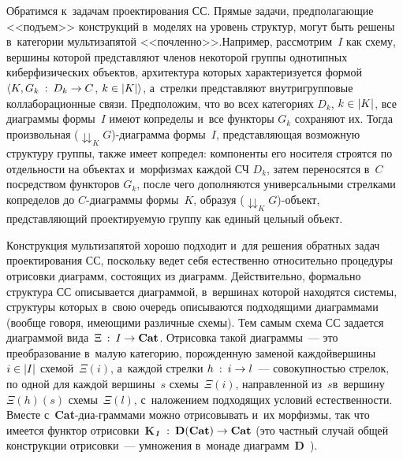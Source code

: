 \begin{multicols}{2}
Обратимся к~задачам проектирования СС. Прямые задачи, пред\-по\-ла\-га\-ющие 
<<подъем>> конструкций в~моделях на уровень структур, могут быть решены 
в~категории мультизапятой <<почленно>>.\linebreak Например, рассмотрим~$I$ как 
схему, вершины которой представляют членов некоторой группы однотипных 
киберфизических объектов, архитектура которых характеризуется формой  
$\langle K, G_k \: : \: D_k \hm\to C$, $k \hm\in \vert K\vert\rangle$, а~стрелки представляют 
внутригрупповые коллаборационные связи. Предположим, что во всех 
категориях $D_k$, $k \hm\in \vert K\vert$, все диаграммы формы~$I$ имеют 
копределы и~все функторы $G_k$ сохраняют их. Тогда произвольная  
($\downdownarrows_K G$)-диа\-грам\-ма формы~$I$, пред\-став\-ля\-ющая 
возможную структуру группы, также имеет копредел: компоненты его носителя 
строятся по от\-дель\-ности на объектах и~морфизмах каждой СЧ $D_k$, затем 
переносятся в~$C$ посредством функторов $G_k$, после чего дополняются 
универсальными стрелками копределов до $C$-диа\-грам\-мы формы~$K$, 
образуя ($\downdownarrows_K G$)-объект, представляющий про\-ек\-ти\-ру\-емую 
группу как единый цельный объект.

Конструкция мультизапятой хорошо подходит и~для решения обратных задач 
проектирования СС, поскольку ведет себя естественно относительно 
процедуры отрисовки диаграмм, со\-сто\-ящих из диаграмм. Действительно, 
формально структура СС описывается диаграммой, в~вершинах которой 
находятся сис\-те\-мы, структуры которых в~свою очередь описываются 
подходящими диаграммами (вообще говоря, имеющими различные схемы). Тем 
самым схема СС задается диаграммой вида~$\Xi \: : \: I \hm\to \mathbf{Cat}$. 
Отрисовка такой диаграммы~--- это преобразование в~малую категорию, 
порожденную заменой каждой\linebreak вершины $i \hm\in \vert I\vert$ схемой~$\Xi (i)$, 
а~каждой стрелки $h \: : \: i \hm\to l$~--- совокупностью стрелок, по одной для 
каждой вершины~$s$ схемы~$\Xi (i)$, на\-прав\-лен\-ной из~$s$\linebreak в~вершину~$\Xi (h)(s)$ 
схемы~$\Xi (l)$, с~наложением подходящих условий 
естественности. Вместе с~\textbf{Cat}-диа-\linebreak грам\-ма\-ми можно отрисовывать 
и~их морфизмы, так что имеется функтор отрисовки~\textbf{K}$_{\text{\bfseries\textit{1}}} \: : \: \mathbf{D(Cat)} 
\hm\to \mathbf{Cat}$ (это част\-ный случай общей конструкции 
отрисовки~--- умножения в~монаде диаграмм~\textbf{D}~\cite{12-kov}).


\end{multicols}
